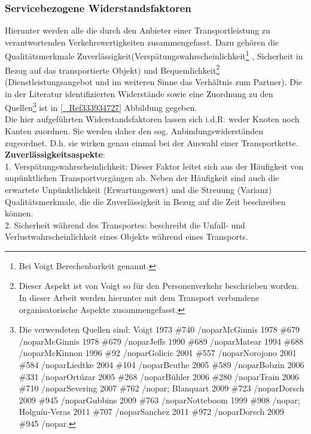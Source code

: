 \subsubsection{Servicebezogene Widerstandsfaktoren}
\label{_Ref333942723}
\label{_Toc335661021}
\label{_Toc366766114}
\label{_Toc366775308}
Hierunter werden alle die durch den Anbieter einer Transportleistung zu verantwortenden Verkehrswertigkeiten zusammengefasst. Dazu gehören die Qualitätsmerkmale \glqq Zuverlässigkeit\grqq   (\glqq Verspätungswahrscheinlichkeit\grqq \footnote{%
 Bei Voigt Berechenbarkeit genannt.
}%
, \glqq Sicherheit in Bezug auf das transportierte Objekt\grqq ) und \glqq Bequemlichkeit\grqq \footnote{%
 Dieser Aspekt ist von Voigt so für den Personenverkehr beschrieben worden. In dieser Arbeit werden hierunter mit dem Transport verbundene organisatorische Aspekte zusammengefasst.
}%
 (Dienstleistungsangebot und im weiteren Sinne das Verhältnis zum Partner). Die in der Literatur identifizierten Widerstände sowie eine Zuordnung zu den Quellen\footnote{%
 Die verwendeten Quellen sind: {Voigt 1973 \#740 /nopar}{McGinnis 1978 \#679 /nopar}{McGinnis 1978 \#679 /nopar}{Jeffs 1990 \#689 /nopar}{Matear 1994 \#688 /nopar}{McKinnon 1996 \#92 /nopar}{Golicic 2001 \#557 /nopar}{Norojono 2001 \#584 /nopar}{Liedtke 2004 \#104 /nopar}{Beuthe 2005 \#589 /nopar}{Bobzin 2006 \#331 /nopar}{Ortúzar 2005 \#268 /nopar}{Bühler 2006 \#280 /nopar}{Train 2006 \#710 /nopar}{Severing 2007 \#762 /nopar}; {Blanquart 2009 \#723 /nopar}{Dorsch 2009 \#945 /nopar}{Gubbins 2009 \#763 /nopar}{Notteboom 1999 \#908 /nopar}; {Holguín-Veras 2011 \#707 /nopar}{Sanchez 2011 \#972 /nopar}{Dorsch 2009 \#945 /nopar}.
}%
 ist in \autoref{_Ref333934727} Abbildung  gegeben.~\\
Die hier aufgeführten Widerstandsfaktoren lassen sich i.d.R. weder Knoten noch Kanten zuordnen. Sie werden daher den sog. Anbindungswiderständen zugeordnet. D.h. sie wirken genau einmal bei der Auswahl einer Transportkette.~\\
\textbf{Zuverlässigkeitsaspekte}:~\\
1. Verspätungswahrscheinlichkeit: Dieser Faktor leitet sich aus der Häufigkeit von unpünktlichen Transportvorgängen ab. Neben der Häufigkeit sind auch die erwartete Unpünktlichkeit (Erwartungswert) und die Streuung (Varianz) Qualitätsmerkmale, die die Zuverlässigkeit in Bezug auf die Zeit beschreiben können.~\\
2. Sicherheit während des Transportes: beschreibt die Unfall- und Verlustwahrscheinlichkeit eines Objekts während eines Transports.~\\
